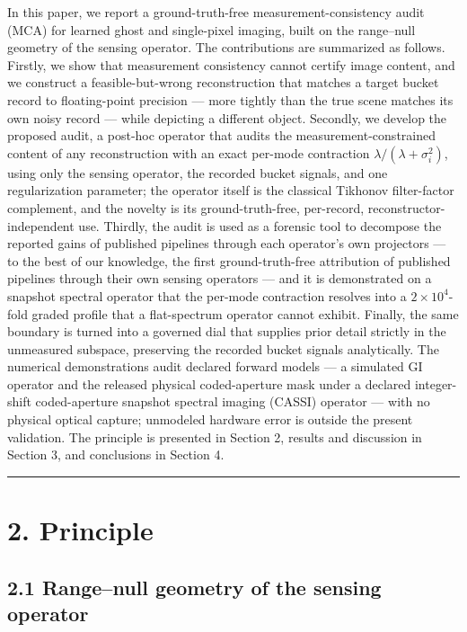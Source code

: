 \documentclass[11pt]{article}
\begin{document}
In this paper, we report a ground-truth-free measurement-consistency audit (MCA) for learned ghost and single-pixel imaging, built on the range--null geometry of the sensing operator. The contributions are summarized as follows. Firstly, we show that measurement consistency cannot certify image content, and we construct a feasible-but-wrong reconstruction that matches a target bucket record to floating-point precision --- more tightly than the true scene matches its own noisy record --- while depicting a different object. Secondly, we develop the proposed audit, a post-hoc operator that audits the measurement-constrained content of any reconstruction with an exact per-mode contraction $\lambda/(\lambda+\sigma_i^2)$, using only the sensing operator, the recorded bucket signals, and one regularization parameter; the operator itself is the classical Tikhonov filter-factor complement, and the novelty is its ground-truth-free, per-record, reconstructor-independent use. Thirdly, the audit is used as a forensic tool to decompose the reported gains of published pipelines through each operator's own projectors --- to the best of our knowledge, the first ground-truth-free attribution of published pipelines through their own sensing operators --- and it is demonstrated on a snapshot spectral operator that the per-mode contraction resolves into a $2\times10^4$-fold graded profile that a flat-spectrum operator cannot exhibit. Finally, the same boundary is turned into a governed dial that supplies prior detail strictly in the unmeasured subspace, preserving the recorded bucket signals analytically. The numerical demonstrations audit declared forward models --- a simulated GI operator and the released physical coded-aperture mask under a declared integer-shift coded-aperture snapshot spectral imaging (CASSI) operator --- with no physical optical capture; unmodeled hardware error is outside the present validation. The principle is presented in Section 2, results and discussion in Section 3, and conclusions in Section 4.

\medskip\hrule\medskip

\section*{2. Principle}

\subsection*{2.1 Range--null geometry of the sensing operator}
\end{document}
